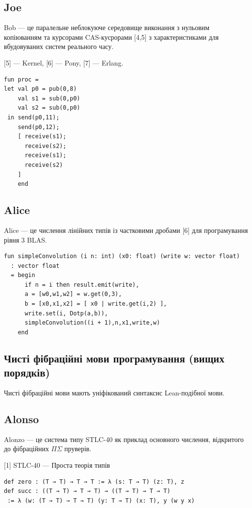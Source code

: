 \subsection*{Joe}

Bob — це паралельне неблокуюче середовище виконання з нульовим копіюванням
та курсорами CAS-кусрорами [4,5] з характеристиками для вбудовуваних систем
реального часу.

[5] — Kernel, [6] — Pony, [7] — Erlang.

\begin{lstlisting}[mathescape=true]
fun proc =
let val p0 = pub(0,8)
    val s1 = sub(0,p0)
    val s2 = sub(0,p0)
 in send(p0,11);
    send(p0,12);
    [ receive(s1);
      receive(s2);
      receive(s1);
      receive(s2)
    ]
    end
\end{lstlisting}

\subsection*{Alice}

Alice — це числення лінійних типів із частковими дробами [6] для програмування рівня 3 BLAS.

\begin{lstlisting}[mathescape=true]
fun simpleConvolution (i n: int) (x0: float) (write w: vector float)
  : vector float
  = begin
      if n = i then result.emit(write),
      a = [w0,w1,w2] = w.get(0,3),
      b = [x0,x1,x2] = [ x0 | write.get(i,2) ],
      write.set(i, Dotp(a,b)),
      simpleConvolution((i + 1),n,x1,write,w)
    end
\end{lstlisting}

\newpage
\subsection*{Чисті фібраційні мови програмування (вищих порядків)}
Чисті фібраційні мови мають уніфікований синтаксис Lean-подібної мови.

\subsection*{Alonso}

Alonzo — це система типу STLC-40 як приклад основного числення,
відкритого до фібраційних $\Pi\Sigma$ пруверів.

[1] STLC-40 — Проста теорія типів

\begin{lstlisting}[mathescape=true]
def zero : (T → T) → T → T := λ (s: T → T) (z: T), z
def succ : ((T → T) → T → T) → ((T → T) → T → T)
 := λ (w: (T → T) → T → T) (y: T → T) (x: T), y (w y x)
\end{lstlisting}


